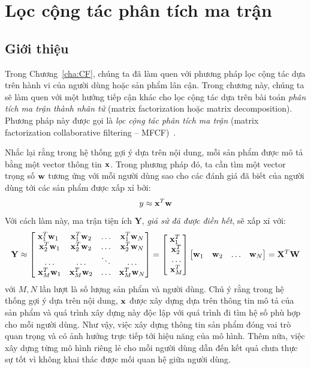 \chapter{Lọc cộng tác phân tích ma trận}
\label{cha:matrix_factorization}
\section{Giới thiệu }
Trong Chương~\ref{cha:CF}, chúng ta đã làm quen với phương pháp
lọc cộng tác dựa trên hành vi của người dùng hoặc sản phẩm lân cận. Trong chương này, chúng ta sẽ làm quen với một hướng
tiếp cận khác cho lọc cộng tác dựa trên bài toán
\textit{phân tích ma trận thành nhân tử} ({matrix factorization} hoặc
{matrix decomposition}). Phương pháp này được gọi
là \textit{lọc cộng tác phân tích ma trận} ({matrix factorization collaborative filtering} -- MFCF)~\cite{koren2009matrix}.

Nhắc lại rằng trong hệ thống gợi ý dựa trên nội dung, mỗi sản phẩm được
mô tả bằng một vector thông tin $\mathbf{x}$. Trong phương pháp
đó, ta cần tìm một vector trọng số $\mathbf{w}$ tương ứng với mỗi người dùng sao cho các đánh giá đã biết của người dùng tới các sản phẩm được xấp xỉ bởi:
\begin{equation}
y \approx \mathbf{x}^T\mathbf{w}
\end{equation}
Với cách làm này, ma trận tiện ích $\mathbf{Y}$, \textit{giả sử đã được điền
hết}, sẽ xấp xỉ với:
\begin{equation}
\mathbf{Y} \approx \left[ \begin{matrix} \bx^T_1\bw_1 &
\bx^T_1\bw_2 & \dots & \bx^T_1 \bw_N\\\
\bx^T_2\bw_1 & \bx^T_2\bw_2 & \dots &
\bx^T_2 \bw_N\\\ \dots & \dots & \ddots & \dots \\\
\bx^T_M\bw_1 & \bx^T_M\bw_2 & \dots & \bx^T_M \bw_N \end{matrix} \right] = \left[ \begin{matrix} \bx^T_1 \\\ \bx^T_2 \\\ \dots \\\ \bx^T_M  \end{matrix} \right]
\left[ \begin{matrix} \bw_1 & \bw_2 & \dots & \bw_N \end{matrix} \right] = \bX^T\bW
\end{equation}
với $M, N$ lần lượt là số lượng sản phẩm và người dùng. Chú ý rằng trong
hệ thống gợi ý dựa trên nội dung, $\mathbf{x}$ được xây dựng dựa trên thông
tin mô tả của sản phẩm và quá trình xây dựng này độc lập với quá trình đi
tìm hệ số phù hợp cho mỗi người dùng. Như vậy, việc xây dựng thông tin sản phẩm đóng vai trò quan trọng và có ảnh hưởng trực tiếp tới hiệu năng của
mô hình. Thêm nữa, việc xây dựng từng mô hình riêng lẻ cho mỗi người dùng dẫn
đến kết quả chưa thực sự tốt vì không khai thác được mối quan hệ giữa
người dùng.

